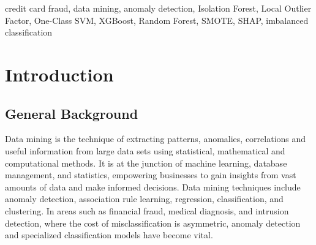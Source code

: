 \documentclass[conference]{IEEEtran}
\begin{document}
\begin{abstract}
This credit card fraud is a global issue impacting financial institutions and consumers alike and is estimated to cost billions of dollars globally annually. A thorough data mining research work is carried out on the publicly available Kaggle Credit Card Fraud database for the credit card fraud detection problem. We compare three unsupervised anomaly detection algorithms: Isolation Forest, Local Outlier Factor (LOF), and One-Class SVM; and four supervised classification models: Logistic Regression, Random Forest, XGBoost, and Gradient Boosting. Feature engineering is carried out to enrich the feature space such as log transformation of transaction amount, PCA-component interaction, statistical z-scores, etc. Class imbalance is addressed using Synthetic Minority Over-sampling Technique (SMOTE). The results show that supervised models, particularly XGBoost and Random Forest, perform much better than unsupervised models in terms of F1-Score, and Isolation Forest is competitive without relying on labels for AUC-ROC. The most predictive variables from SHAP explainability analysis are V14, V4, V12, and transaction amount features.

\textbf{Background:} Credit card fraud is becoming a ubiquitous issue in our society and has generated a number of methodologies that might address the problem.

\textbf{Motivation:} In this paper, we consider several methodologies, including the Isolation Forest, Local Outlier Factor, One-Class SVM, XGBoost, Random Forest, SMOTE, and SHAP, that could be used to combat credit card fraud.
\end{abstract}

\begin{IEEEkeywords}
credit card fraud, data mining, anomaly detection, Isolation Forest, Local Outlier Factor, One-Class SVM, XGBoost, Random Forest, SMOTE, SHAP, imbalanced classification
\end{IEEEkeywords}

\section{Introduction}

\subsection{General Background}
Data mining is the technique of extracting patterns, anomalies, correlations and useful information from large data sets using statistical, mathematical and computational methods. It is at the junction of machine learning, database management, and statistics, empowering businesses to gain insights from vast amounts of data and make informed decisions. Data mining techniques include anomaly detection, association rule learning, regression, classification, and clustering. In areas such as financial fraud, medical diagnosis, and intrusion detection, where the cost of misclassification is asymmetric, anomaly detection and specialized classification models have become vital.
\end{document}
